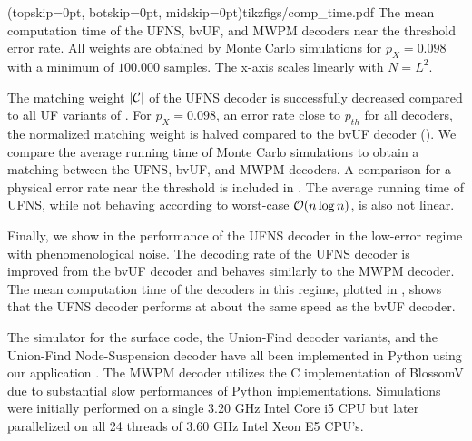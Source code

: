 \Figure[b!](topskip=0pt, botskip=0pt, midskip=0pt){tikzfigs/comp_time.pdf}{
  The mean computation time of the UFNS, bvUF, and MWPM decoders near the threshold error rate. All weights are obtained by Monte Carlo simulations for $p_X=0.098$ with a minimum of $100.000$ samples. The x-axis scales linearly with $N = L^2$.\label{comp_time}}

The matching weight $\lvert\mathcal{C}\rvert$ of the UFNS decoder is successfully decreased compared to all UF variants of . For $p_X = 0.098$, an error rate close to $p_{th}$ for all decoders, the normalized matching weight is halved compared to the bvUF decoder (). We compare the average running time of Monte Carlo simulations to obtain a matching between the UFNS, bvUF, and MWPM decoders. A comparison for a physical error rate near the threshold is included in . The average running time of UFNS, while not behaving according to worst-case $\mathcal{O}(n \log{n})$, is also not linear. 

Finally, we show in  the performance of the UFNS decoder in the low-error regime with phenomenological noise. The decoding rate of the UFNS decoder is improved from the bvUF decoder and behaves similarly to the MWPM decoder. The mean computation time of the decoders in this regime, plotted in , shows that the UFNS decoder performs at about the same speed as the bvUF decoder.\par

The simulator for the surface code, the Union-Find decoder variants, and the Union-Find Node-Suspension decoder have all been implemented in Python using our application \cite{OpenSurfaceSim}. The MWPM decoder utilizes the C implementation of BlossomV \cite{kolmogorov2009blossom} due to substantial slow performances of Python implementations. Simulations were initially performed on a single 3.20 GHz Intel Core i5 CPU but later parallelized on all 24 threads of 3.60 GHz Intel Xeon E5 CPU's. 